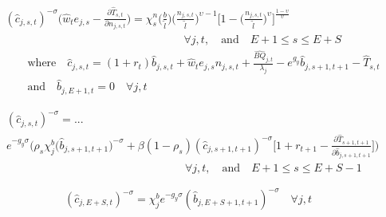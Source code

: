 \documentclass[letterpaper,12pt]{article}
\theoremstyle{definition}
\begin{document}
\begin{spacing}{1.5}
    \begin{equation}\label{EqEulerLabStat}
      \begin{split}
        &(\hat{c}_{j,s,t})^{-\sigma}\Biggl(\hat{w}_t e_{j,s} - \frac{\partial\hat{T}_{s,t}}{\partial n_{j,s,t}}\Biggr) = \chi^n_{s}\biggl(\frac{b}{\tilde{l}}\biggr)\biggl(\frac{n_{j,s,t}}{\tilde{l}}\biggr)^{\upsilon-1}\Biggl[1 - \biggl(\frac{n_{j,s,t}}{\tilde{l}}\biggr)^\upsilon\Biggr]^{\frac{1-\upsilon}{\upsilon}} \\
        &\qquad\qquad\qquad\qquad\qquad\qquad\qquad\qquad\forall j,t, \quad\text{and}\quad E+1\leq s\leq E+S \\
        &\qquad\text{where}\quad \hat{c}_{j,s,t} = \left(1 + r_t\right)\hat{b}_{j,s,t} + \hat{w}_t e_{j,s}n_{j,s,t} + \frac{\hat{BQ}_{j,t}}{\lambda_j} - e^{g_y}\hat{b}_{j,s+1,t+1} - \hat{T}_{s,t} \\
        &\qquad\text{and}\quad \hat{b}_{j,E+1,t} = 0 \quad\forall j,t
      \end{split}
    \end{equation}

    \begin{equation}\label{EqEulerSavStat}
      \begin{split}
        &(\hat{c}_{j,s,t})^{-\sigma} = ... \\
        &e^{-g_y\sigma}\Biggl(\rho_s\chi^b_j \bigl(\hat{b}_{j,s+1,t+1}\bigr)^{-\sigma} + \beta(1-\rho_s)(\hat{c}_{j,s+1,t+1})^{-\sigma}\Biggl[1 + r_{t+1} - \frac{\partial \hat{T}_{s+1,t+1}}{\partial \hat{b}_{j,s+1,t+1}}\Biggr]\Biggr) \\
        &\qquad\qquad\qquad\qquad\qquad\qquad\qquad\qquad\forall j,t,\quad\text{and}\quad E+1\leq s \leq E+S-1
      \end{split}
    \end{equation}

    \begin{equation}\label{EqEulerSavEpSstat}
      (\hat{c}_{j,E+S,t})^{-\sigma} = \chi^b_j e^{-g_y\sigma}(\hat{b}_{j,E+S+1,t+1})^{-\sigma} \quad\forall j,t
    \end{equation}


\end{spacing}
\end{document}
